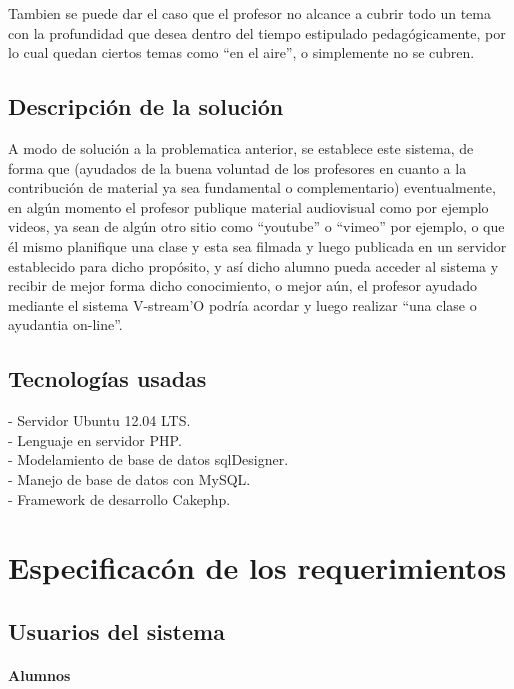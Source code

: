 \documentclass[12pt]{article}
\begin{document}
Tambien se puede dar el caso que el profesor no alcance a cubrir todo un tema con la profundidad que desea
dentro del tiempo estipulado pedagógicamente, por lo cual quedan ciertos temas como ``en el aire'', o
simplemente no se cubren.


\subsection{Descripción de la solución}
A modo de solución a la problematica anterior, se establece este sistema, de forma que (ayudados de la buena
voluntad de los profesores en cuanto a la contribución de material ya sea fundamental o complementario) 
eventualmente, en algún momento el profesor publique material
audiovisual como por ejemplo videos, ya sean de algún otro sitio como ``youtube'' o ``vimeo'' por ejemplo, o 
que él mismo planifique una clase y esta sea filmada y luego publicada en un servidor establecido para dicho 
propósito, y así dicho alumno pueda acceder al sistema y recibir de mejor forma dicho conocimiento, 
o mejor aún, el profesor ayudado mediante el sistema V-stream'O podría
acordar y luego realizar ``una clase o ayudantia on-line''.

\subsection{Tecnologías usadas}

- Servidor Ubuntu 12.04 LTS.\\

- Lenguaje en servidor PHP.\\

- Modelamiento de base de datos sqlDesigner.\\

- Manejo de base de datos con MySQL.\\

- Framework de desarrollo Cakephp.\\ 


\newpage
\section{Especificacón de los requerimientos}
\subsection{Usuarios del sistema}
\paragraph{Alumnos\\}
\end{document}
